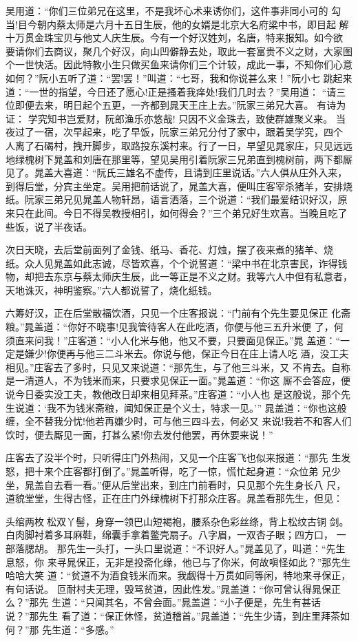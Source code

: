 吴用道：“你们三位弟兄在这里，不是我坏心术来诱你们，这件事非同小可的
勾当!目今朝内蔡太师是六月十五日生辰，他的女婿是北京大名府梁中书，即目起
解十万贯金珠宝贝与他丈人庆生辰。今有一个好汉姓刘，名唐，特来报知。如今欲
要请你们去商议，聚几个好汉，向山凹僻静去处，取此一套富贵不义之财，大家图
个一世快活。因此特教小生只做买鱼来请你们三个计较，成此一事，不知你们心意
如何？”阮小五听了道：“罢!罢！”叫道：“七哥，我和你说甚么来！”阮小七
跳起来道：“一世的指望，今日还了愿心!正是搔着我痒处!我们几时去？”吴用道：
“请三位即便去来，明日起个五更，一齐都到晁天王庄上去。”阮家三弟兄大喜。
有诗为证：
学究知书岂爱财，阮郎渔乐亦悠哉!
只因不义金珠去，致使群雄聚义来。
当夜过了一宿，次早起来，吃了早饭，阮家三弟兄分付了家中，跟着吴学究，四个
人离了石碣村，拽开脚步，取路投东溪村来。行了一日，早望见晁家庄，只见远远
地绿槐树下晁盖和刘唐在那里等，望见吴用引着阮家三兄弟直到槐树前，两下都厮
见了。晁盖大喜道：“阮氏三雄名不虚传，且请到庄里说话。”六人俱从庄外入来，
到得后堂，分宾主坐定。吴用把前话说了，晁盖大喜，便叫庄客宰杀猪羊，安排烧
纸。阮家三弟兄见晁盖人物轩昂，语言洒落，三个说道：“我们最爱结识好汉，原
来只在此间。今日不得吴教授相引，如何得会？”三个弟兄好生欢喜。当晚且吃了
些饭，说了半夜话。

次日天晓，去后堂前面列了金钱、纸马、香花、灯烛，摆了夜来煮的猪羊、烧
纸。众人见晁盖如此志诚，尽皆欢喜，个个说誓道：“梁中书在北京害民，诈得钱
物，却把去东京与蔡太师庆生辰，此一等正是不义之财。我等六人中但有私意者，
天地诛灭，神明鉴察。”六人都说誓了，烧化纸钱。

六筹好汉，正在后堂散福饮酒，只见一个庄客报说：“门前有个先生要见保正
化斋粮。”晁盖道：“你好不晓事!见我管待客人在此吃酒，你便与他三五升米便
了，何须直来问我！”庄客道：“小人化米与他，他又不要，只要面见保正。”晁
盖道：“一定是嫌少!你便再与他三二斗米去。你说与他，保正今日在庄上请人吃
酒，没工夫相见。”庄客去了多时，只见又来说道：“那先生，与了他三斗米，又
不肯去。自称是一清道人，不为钱米而来，只要求见保正一面。”晁盖道：“你这
厮不会答应，便说今日委实没工夫，教他改日却来相见拜茶。”庄客道：“小人也
是这般说，那个先生说道：‘我不为钱米斋粮，闻知保正是个义士，特求一见。’”
晁盖道：“你也这般缠，全不替我分忧!他若再嫌少时，可与他三四斗去，何必又
来说!我若不和客人们饮时，便去厮见一面，打甚么紧!你去发付他罢，再休要来说！”

庄客去了没半个时，只听得庄门外热闹，又见一个庄客飞也似来报道：“那先
生发怒，把十来个庄客都打倒了。”晁盖听得，吃了一惊，慌忙起身道：“众位弟
兄少坐，晁盖自去看一看。”便从后堂出来，到庄门前看时，只见那个先生身长八
尺，道貌堂堂，生得古怪，正在庄门外绿槐树下打那众庄客。晁盖看那先生，但见：

头绾两枚松双丫髻，身穿一领巴山短褐袍，腰系杂色彩丝绦，背上松纹古铜
剑。白肉脚衬着多耳麻鞋，绵囊手拿着鳖壳扇子。八字眉，一双杏子眼；四方口，
一部落腮胡。
那先生一头打，一头口里说道：“不识好人。”晁盖见了，叫道：“先生息怒，你
来寻晁保正，无非是投斋化缘，他已与了你米，何故嗔怪如此？”那先生哈哈大笑
道：“贫道不为酒食钱米而来。我觑得十万贯如同等闲，特地来寻保正，有句话说。
叵耐村夫无理，毁骂贫道，因此性发。”晁盖道：“你可曾认得晁保正么？”那先
生道：“只闻其名，不曾会面。”晁盖道：“小子便是，先生有甚话说？”那先生
看了道：“保正休怪，贫道稽首。”晁盖道：“先生少请，到庄里拜茶如何？”那
先生道：“多感。”

